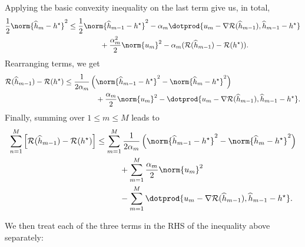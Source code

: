 Applying the basic convexity inequality on the last term give us, in total,
\begin{align*}
    \frac{ 1 }{ 2 } \norm{ \hat{ h }_{ m } - \hstar }^2
    &\leq
    \frac{ 1 }{ 2 } \norm{ \hat{ h }_{ m-1 } - \hstar }^2
    - \alpha_{ m } \dotprod{ u_{ m } - \nabla \risk ( \hat{ h }_{ m-1 } ), \hat{ h }_{ m-1 } - \hstar } \\
    &\hspace{1.5cm}
    + \frac{ \alpha_{ m }^2 }{ 2 } \norm{ u_{ m } }^2
    - \alpha_{ m } ( \risk ( \hat{ h }_{ m-1 } ) - \risk ( \hstar ) )
.\end{align*}
Rearranging terms, we get
\begin{align*}
    \risk ( \hat{ h }_{ m-1 } ) - \risk ( \hstar )
    &\leq
    \frac{ 1 }{ 2 \alpha_{ m } } \left(
        \norm{ \hat{ h }_{ m-1 } - \hstar }^2
        -
        \norm{ \hat{ h }_{ m } - \hstar }^2
    \right) \\
    &\hspace{1.5cm}+ \frac{ \alpha_{ m } }{ 2 } \norm{ u_{ m } }^2
    - \dotprod{ u_{ m } - \nabla \risk ( \hat{ h }_{ m-1 } ), \hat{ h }_{ m-1 } - \hstar }
.\end{align*}
Finally, summing over $ 1 \leq m \leq M $ leads to
\begin{align*}
    \sum_{ n=1 }^{ M } \left[
        \risk ( \hat{ h }_{ m-1 } ) - \risk ( \hstar )
    \right]
    &\leq \sum_{ m=1 }^{ M } \frac{ 1 }{ 2 \alpha_{ m } } \left(
        \norm{ \hat{ h }_{ m-1 } - \hstar }^2
        -
        \norm{ \hat{ h }_{ m } - \hstar }^2
    \right) \\
    &\hspace{1cm} + \sum_{ m=1 }^{ M } \frac{ \alpha_{ m } }{ 2 } \norm{ u_{ m } }^2 \\
    &\hspace{1cm} - \sum_{ m=1 }^{ M }
    \dotprod{ u_{ m } - \nabla \risk ( \hat{ h }_{ m-1 } ), \hat{ h }_{ m-1 } - \hstar }
.\end{align*}

We then treat each of the three terms in the RHS of the inequality above separately:

